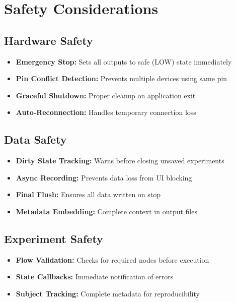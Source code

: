 \documentclass[11pt,a4paper]{article}
\begin{document}
\section{Safety Considerations}

\subsection{Hardware Safety}

\begin{itemize}    \item \textbf{Emergency Stop:} Sets all outputs to safe (LOW) state immediately
    \item \textbf{Pin Conflict Detection:} Prevents multiple devices using same pin
    \item \textbf{Graceful Shutdown:} Proper cleanup on application exit
    \item \textbf{Auto-Reconnection:} Handles temporary connection loss
\end{itemize}

\subsection{Data Safety}

\begin{itemize}    \item \textbf{Dirty State Tracking:} Warns before closing unsaved experiments
    \item \textbf{Async Recording:} Prevents data loss from UI blocking
    \item \textbf{Final Flush:} Ensures all data written on stop
    \item \textbf{Metadata Embedding:} Complete context in output files
\end{itemize}

\subsection{Experiment Safety}

\begin{itemize}    \item \textbf{Flow Validation:} Checks for required nodes before execution
    \item \textbf{State Callbacks:} Immediate notification of errors
    \item \textbf{Subject Tracking:} Complete metadata for reproducibility
\end{itemize}
\end{document}
